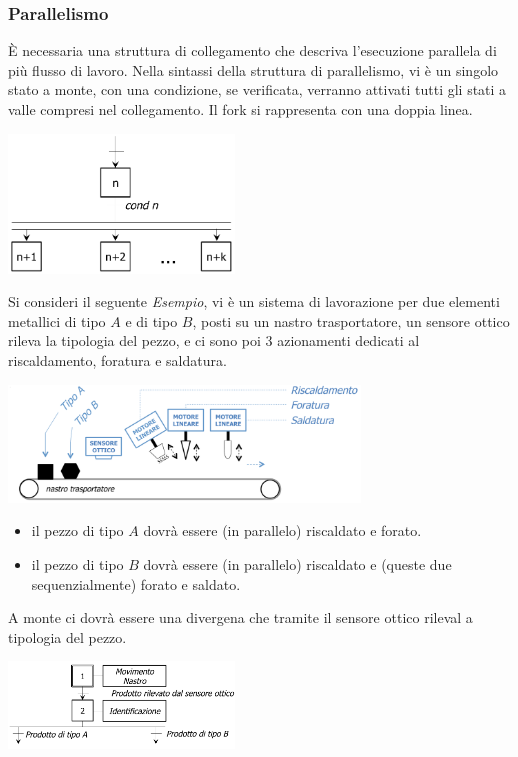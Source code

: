 \documentclass[10pt, letterpaper]{report}
\begin{document}
\subsubsection{Parallelismo}
È necessaria una struttura di collegamento che descriva l'esecuzione parallela di più flusso di lavoro. Nella sintassi della struttura di parallelismo, vi è un singolo stato a monte, con una condizione, se verificata, verranno attivati tutti gli stati a valle compresi nel collegamento. Il fork si rappresenta con una doppia linea.
\begin{center}
    \includegraphics[width=0.45\textwidth ]{images/parallelismo.png}
\end{center}
Si consideri il seguente \textit{Esempio}, vi è un sistema di lavorazione per due elementi metallici di tipo $A$ e di tipo $B$, posti su un nastro trasportatore, un sensore ottico rileva la tipologia del pezzo, e ci sono poi 3 azionamenti dedicati al riscaldamento, foratura e saldatura.
\begin{center}
    \includegraphics[width=0.7\textwidth ]{images/esempioPezzi.png}
\end{center}
\begin{itemize}
    \item il pezzo di tipo $A$ dovrà essere (in parallelo) riscaldato e forato. 
    \item il pezzo di tipo $B$ dovrà essere (in parallelo) riscaldato e (queste due sequenzialmente) forato e saldato.
\end{itemize}
A monte ci dovrà essere una divergena che tramite il sensore ottico rileval a tipologia del pezzo.
\begin{center}
    \includegraphics[width=0.45\textwidth ]{images/esempioPezzi2.png}
\end{center}
\end{document}
